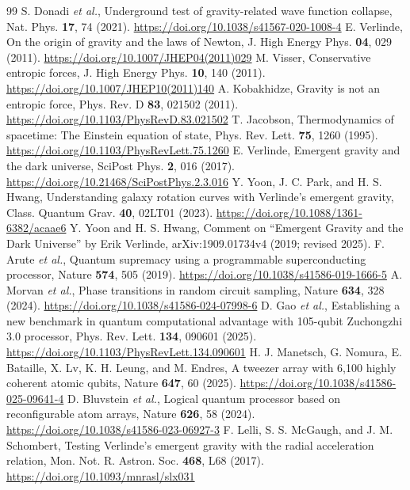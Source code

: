 \documentclass[aps,prd,twocolumn,superscriptaddress,nofootinbib,showkeys]{revtex4-2}
\begin{document}
\begin{thebibliography}{99}
 S. Donadi \emph{et al.}, Underground test of gravity-related wave function collapse, Nat. Phys. \textbf{17}, 74 (2021). \url{https://doi.org/10.1038/s41567-020-1008-4}
 E. Verlinde, On the origin of gravity and the laws of Newton, J. High Energy Phys. \textbf{04}, 029 (2011). \url{https://doi.org/10.1007/JHEP04(2011)029}
 M. Visser, Conservative entropic forces, J. High Energy Phys. \textbf{10}, 140 (2011). \url{https://doi.org/10.1007/JHEP10(2011)140}
 A. Kobakhidze, Gravity is not an entropic force, Phys. Rev. D \textbf{83}, 021502 (2011). \url{https://doi.org/10.1103/PhysRevD.83.021502}
 T. Jacobson, Thermodynamics of spacetime: The Einstein equation of state, Phys. Rev. Lett. \textbf{75}, 1260 (1995). \url{https://doi.org/10.1103/PhysRevLett.75.1260}
 E. Verlinde, Emergent gravity and the dark universe, SciPost Phys. \textbf{2}, 016 (2017). \url{https://doi.org/10.21468/SciPostPhys.2.3.016}
 Y. Yoon, J. C. Park, and H. S. Hwang, Understanding galaxy rotation curves with Verlinde's emergent gravity, Class. Quantum Grav. \textbf{40}, 02LT01 (2023). \url{https://doi.org/10.1088/1361-6382/acaae6}
 Y. Yoon and H. S. Hwang, Comment on ``Emergent Gravity and the Dark Universe'' by Erik Verlinde, arXiv:1909.01734v4 (2019; revised 2025).
 F. Arute \emph{et al.}, Quantum supremacy using a programmable superconducting processor, Nature \textbf{574}, 505 (2019). \url{https://doi.org/10.1038/s41586-019-1666-5}
 A. Morvan \emph{et al.}, Phase transitions in random circuit sampling, Nature \textbf{634}, 328 (2024). \url{https://doi.org/10.1038/s41586-024-07998-6}
 D. Gao \emph{et al.}, Establishing a new benchmark in quantum computational advantage with 105-qubit Zuchongzhi 3.0 processor, Phys. Rev. Lett. \textbf{134}, 090601 (2025). \url{https://doi.org/10.1103/PhysRevLett.134.090601}
 H. J. Manetsch, G. Nomura, E. Bataille, X. Lv, K. H. Leung, and M. Endres, A tweezer array with 6,100 highly coherent atomic qubits, Nature \textbf{647}, 60 (2025). \url{https://doi.org/10.1038/s41586-025-09641-4}
 D. Bluvstein \emph{et al.}, Logical quantum processor based on reconfigurable atom arrays, Nature \textbf{626}, 58 (2024). \url{https://doi.org/10.1038/s41586-023-06927-3}
 F. Lelli, S. S. McGaugh, and J. M. Schombert, Testing Verlinde's emergent gravity with the radial acceleration relation, Mon. Not. R. Astron. Soc. \textbf{468}, L68 (2017). \url{https://doi.org/10.1093/mnrasl/slx031}

\end{thebibliography}
\end{document}
